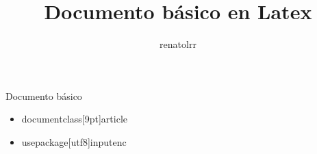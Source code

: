 \documentclass[9pt]{beamer}
\author{renatolrr}
\title{Documento básico en Latex}
\begin{document}
\begin{frame}
\titlepage
\end{frame}


\begin{frame}{Documento básico}
 \begin{itemize}
 \item{documentclass[9pt]{article}}
 \item{usepackage[utf8]{inputenc}}
 \end{itemize}
\end{frame}
\end{document}
